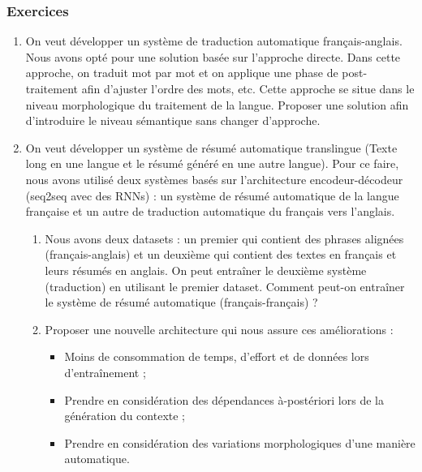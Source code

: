 \documentclass{KodeBook}
\begin{document}

\subsubsection*{Exercices}

\begin{enumerate}
	\item On veut développer un système de traduction automatique français-anglais. Nous avons opté pour une solution basée sur l'approche directe. Dans cette approche, on traduit mot par mot et on applique une phase de post-traitement afin d'ajuster l'ordre des mots, etc.  Cette approche se situe dans le niveau morphologique du traitement de la langue.  Proposer une solution  afin d'introduire le niveau sémantique sans changer d'approche. 
	
	\item On veut développer un système de résumé automatique translingue (Texte long en une langue et le résumé généré en une autre langue). Pour ce faire, nous avons utilisé deux systèmes basés sur l'architecture encodeur-décodeur (seq2seq avec des RNNs) : un système de résumé automatique de la langue française et un autre de traduction automatique du français vers l'anglais. 
	\begin{center}
	\end{center}
	\begin{enumerate}
		\item Nous avons deux datasets : un premier qui contient des phrases alignées (français-anglais) et un deuxième qui contient des textes en français et leurs résumés en anglais. On peut entraîner le deuxième système (traduction) en utilisant le premier dataset. Comment peut-on entraîner le système de résumé automatique (français-français) ? 
		\item Proposer une nouvelle architecture qui nous assure ces améliorations : 
		\begin{itemize}
			\item Moins de consommation de temps, d'effort et de données lors d'entraînement ;
			\item Prendre en considération des dépendances à-postériori lors de la génération du contexte ;
			\item Prendre en considération des variations morphologiques d'une manière automatique.
		\end{itemize}
	\end{enumerate}
	
\end{enumerate}
\end{document}

